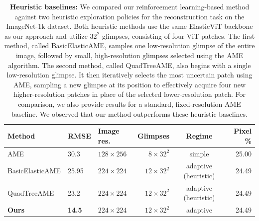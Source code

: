 \begin{table}[th]
\caption{\textbf{Heuristic baselines:} We compared our reinforcement learning-based method against two heuristic exploration policies for the reconstruction task on the ImageNet-1k dataset. Both heuristic methods use the same ElasticViT backbone as our approach and utilize $32^2$ glimpses, consisting of four ViT patches. The first method, called BasicElasticAME, samples one low-resolution glimpse of the entire image, followed by small, high-resolution glimpses selected using the AME algorithm. The second method, called QuadTreeAME, also begins with a single low-resolution glimpse. It then iteratively selects the most uncertain patch using AME, sampling a new glimpse at its position to effectively acquire four new higher-resolution patches in place of the selected lower-resolution patch. For comparison, we also provide results for a standard, fixed-resolution AME baseline. We observed that our method outperforms these heuristic baselines.}
\vspace{-.2cm}
\label{tab:heuristics}
\begin{center}
\begin{small}
\begin{tabular}{l@{\hskip6pt}llr@{\hskip8pt}cr}
\toprule
Method & RMSE & Image res. & Glimpses & Regime & Pixel \% \\
\midrule
AME & 30.3 & $128 \times 256$ & $8 \times 32^2$ &simple & 25.00 \\
BasicElasticAME & 25.95 & $224 \times 224$ & $12 \times 32^2$ & adaptive (heuristic) & 24.49  \\
QuadTreeAME & 23.2 & $224 \times 224$ & $12 \times 32^2$ & adaptive (heuristic) & 24.49  \\
\textbf{Ours} & \textbf{14.5} & $224 \times 224$ & $12 \times 32^2$ & adaptive & 24.49 \\
\bottomrule
\end{tabular}
\end{small}
\end{center}
\end{table}
